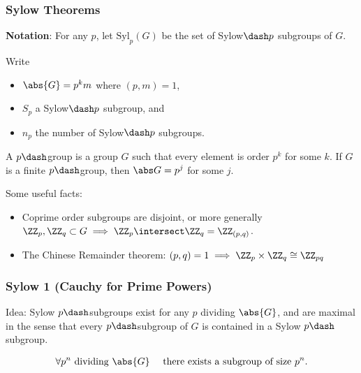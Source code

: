 \hypertarget{sylow-theorems}{%
\subsubsection{Sylow Theorems}\label{sylow-theorems}}

\textbf{Notation}: For any \(p\), let \(\mathrm{Syl}_p(G)\) be the set
of Sylow\(\dash p\) subgroups of \(G\).

Write

\begin{itemize}
\tightlist
\item
  \(\abs{G} = p^k m\) where \((p, m) = 1\),
\item
  \(S_p\) a Sylow\(\dash p\) subgroup, and
\item
  \(n_p\) the number of Sylow\(\dash p\) subgroups.
\end{itemize}

\begin{definition}

A \(p\dash\)group is a group \(G\) such that every element is order
\(p^k\) for some \(k\). If \(G\) is a finite \(p\dash\)group, then
\(\abs G = p^j\) for some \(j\).

\end{definition}

Some useful facts:

\begin{itemize}
\item
  Coprime order subgroups are disjoint, or more generally
  \(\ZZ_p, \ZZ_q \subset G \implies \ZZ_p \intersect \ZZ_q = \ZZ_{(p,q)}\).
\item
  The Chinese Remainder theorem:
  \((p, q) = 1 \implies \ZZ_p \times \ZZ_q \cong \ZZ_{pq}\)
\end{itemize}

\hypertarget{sylow-1-cauchy-for-prime-powers}{%
\subsubsection{Sylow 1 (Cauchy for Prime
Powers)}\label{sylow-1-cauchy-for-prime-powers}}

Idea: Sylow \(p\dash\)subgroups exist for any \(p\) dividing
\(\abs{G}\), and are maximal in the sense that every \(p\dash\)subgroup
of \(G\) is contained in a Sylow \(p\dash\)subgroup.

\begin{align*}
\forall p^n \text{ dividing } \abs{G} \quad \text{ there exists a subgroup of size } p^n
.\end{align*}

